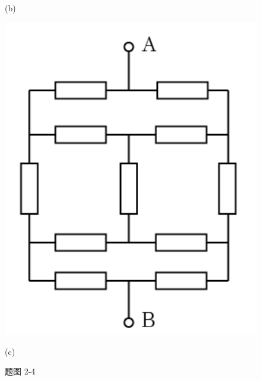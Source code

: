 \documentclass[hyperref, UTF8]{ctexart}
\begin{document}
\begin{figure}[!htb]
\begin{minipage}[t]{0.212\textwidth}
    \caption*{(b)}
  \end{minipage}
  \begin{minipage}[t]{0.193\textwidth}
    \centering
    \includegraphics[width=1\textwidth]{p2-4-c.png}
    \caption*{(c)}
  \end{minipage}
  \caption*{题图 2-4}
\end{figure}
\end{document}
